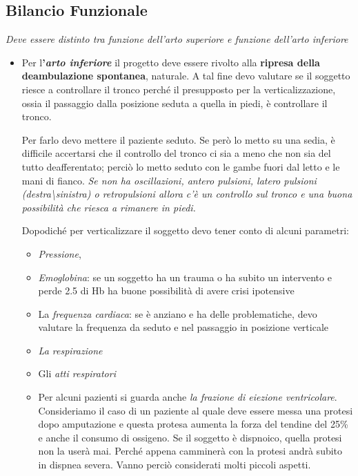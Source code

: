 \subsection{Bilancio Funzionale}

\emph{Deve essere distinto tra funzione dell'arto superiore e funzione dell'arto inferiore}

\begin{itemize}
\item
  Per l\textbf{'\emph{arto inferiore }}il progetto deve essere rivolto alla \textbf{ripresa della deambulazione spontanea}, naturale. A tal fine devo valutare se il soggetto riesce a controllare il tronco perché il presupposto per la verticalizzazione, ossia il passaggio dalla posizione seduta a quella in piedi, è controllare il tronco.

Per farlo devo mettere il paziente seduto. Se però lo metto su una sedia, è difficile accertarsi che il controllo del tronco ci sia a meno che non sia del tutto deafferentato; perciò lo metto seduto con le gambe
fuori dal letto e le mani di fianco. \emph{Se non ha oscillazioni, antero pulsioni, latero pulsioni (destra\textbackslash{}sinistra) o
retropulsioni allora c'è un controllo sul tronco e una buona possibilità che riesca a rimanere in piedi.}

Dopodiché per verticalizzare il soggetto devo tener conto di alcuni
parametri:

\begin{itemize}
\item
  \emph{Pressione},
\item
  \emph{Emoglobina}: se un soggetto ha un trauma o ha subito un intervento e perde 2.5 di Hb ha buone possibilità di avere crisi ipotensive
\item
  La \emph{frequenza cardiaca}: se è anziano e ha delle problematiche, devo valutare la frequenza da seduto e nel passaggio in posizione verticale
\item
  \emph{La respirazione}
\item
  Gli \emph{atti respiratori}
\item
  Per alcuni pazienti si guarda anche \emph{la frazione di eiezione ventricolare}. Consideriamo il caso di un paziente al quale deve essere messa una protesi dopo amputazione e questa protesa aumenta la forza del tendine del 25\% e anche il consumo di ossigeno. Se il soggetto è dispnoico, quella protesi non la userà mai. Perché appena camminerà con la protesi andrà subito in dispnea severa. Vanno perciò considerati molti piccoli aspetti.
\end{itemize}


\end{itemize}
